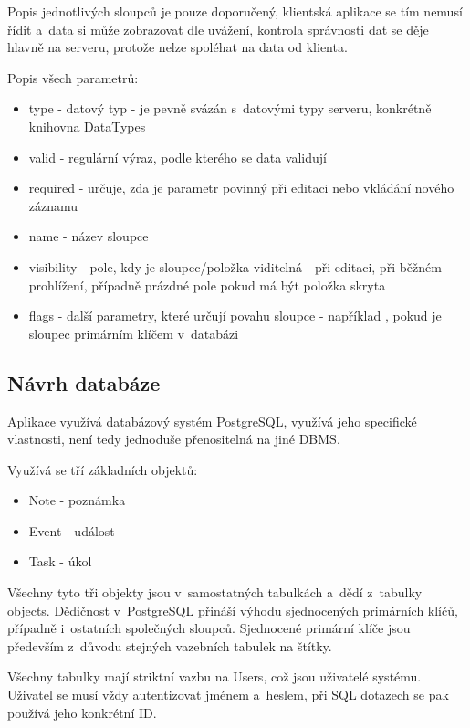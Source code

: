 \documentclass[bc,male,html,dept460]{diploma}				%
\begin{document}
Popis jednotlivých sloupců je pouze doporučený, klientská aplikace se tím nemusí řídit a~data si může zobrazovat dle uvážení,
kontrola správnosti dat se děje hlavně na serveru, protože nelze spoléhat na data od klienta.

\bigskip
Popis všech parametrů:
\begin{itemize}
  \item type - datový typ - je pevně svázán s~datovými typy serveru, konkrétně knihovna DataTypes
  \item valid - regulární výraz, podle kterého se data validují
  \item required - určuje, zda je parametr povinný při editaci nebo vkládání nového záznamu
  \item name - název sloupce 
  \item visibility - pole, kdy je sloupec/položka viditelná -  při editaci,  při běžném prohlížení, případně prázdné pole pokud má být položka skryta
  \item flags - další parametry, které určují povahu sloupce - například , pokud je sloupec primárním klíčem v~databázi
\end{itemize}

\newpage
\subsection{Návrh databáze}

Aplikace využívá databázový systém PostgreSQL, využívá jeho specifické vlastnosti, není tedy jednoduše přenositelná na jiné DBMS.

Využívá se tří základních objektů:
\begin{itemize}
 \item Note - poznámka
 \item Event - událost
 \item Task - úkol
\end{itemize}

Všechny tyto tři objekty jsou v~samostatných tabulkách a~dědí z~tabulky objects.
Dědičnost v~PostgreSQL přináší výhodu sjednocených primárních klíčů, případně i~ostatních společných sloupců.
Sjednocené primární klíče jsou především z~důvodu stejných vazebních tabulek na štítky.

Všechny tabulky mají striktní vazbu na Users, což jsou uživatelé systému.
Uživatel se musí vždy autentizovat jménem a~heslem, při SQL dotazech se pak používá jeho konkrétní ID.
\end{document}
